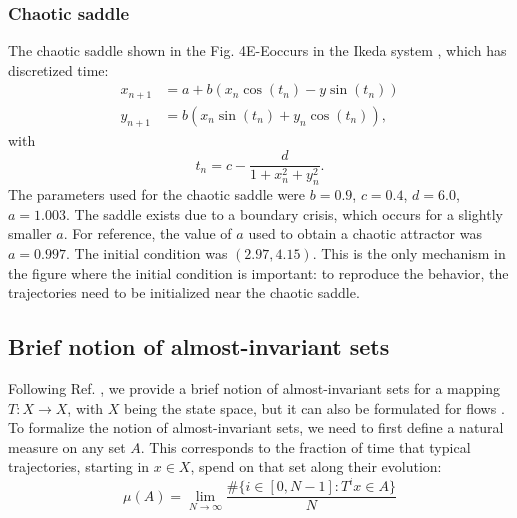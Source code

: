 
\subsubsection{Chaotic saddle}
The chaotic saddle shown in the Fig. 4E-E\ssupprime occurs in the Ikeda system \cite{alligood1997book}, which has discretized time:
\begin{align}
    x_{n+1} &= a+b(x_n \cos(t_n) - y \sin(t_n)) \\ 
    y_{n+1} &= b(x_n \sin(t_n) + y_n \cos(t_n)),  
\end{align}
with 
\begin{equation}
    t_n = c - \frac{d}{1 + x_n^2 + y_n^2}.
\end{equation}
The parameters used for the chaotic saddle were $b = 0.9$, $c = 0.4$, $d = 6.0$, $a = 1.003$. The saddle exists due to a boundary crisis, which occurs for a slightly smaller $a$. For reference, the value of $a$ used to obtain a chaotic attractor was $a = 0.997$. The initial condition was $(2.97, 4.15)$. This is the only mechanism in the figure where the initial condition is important: to reproduce the behavior, the trajectories need to be initialized near the chaotic saddle.

\subsection{Brief notion of almost-invariant sets} \label{sec:brief-notion}
Following Ref. \cite{froyland2005statistically}, we provide a brief notion of almost-invariant sets for a mapping $T : X \to X$, with $X$ being the state space, but it can also be formulated for flows \cite{froyland2009almost}. To formalize the notion of almost-invariant sets, we need to first define a natural measure on any set $A$. This corresponds to the fraction of time that typical trajectories, starting in $x \in X$, spend on that set along their evolution:
\begin{equation}
    \mu (A) = \lim_{N\to\infty} \frac{\# \{i \in [0, N-1] : T^i x \in A \} }{N}
\end{equation}

